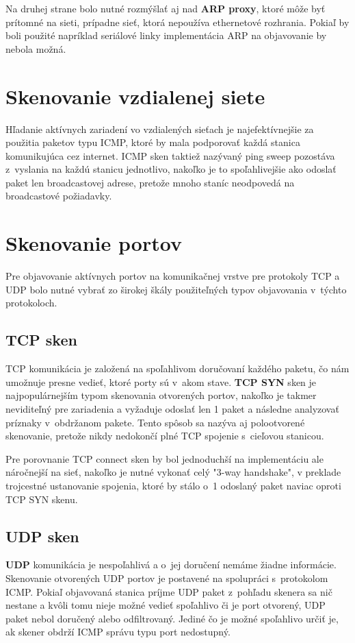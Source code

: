 Na druhej strane bolo nutné rozmýšlať aj nad \textbf{ARP proxy}, ktoré môže byť prítomné na sieti, prípadne sieť, ktorá nepoužíva ethernetové rozhrania. Pokiaľ by boli použité napríklad seriálové linky implementácia ARP na objavovanie by nebola možná.

\section{Skenovanie vzdialenej siete}
Hľadanie aktívnych zariadení vo vzdialených sieťach je najefektívnejšie za použitia paketov typu ICMP, ktoré by mala podporovať každá stanica komunikujúca cez internet. ICMP sken taktiež nazývaný ping sweep pozostáva z~vyslania na každú stanicu jednotlivo, nakoľko je to spoľahlivejšie ako odoslať paket len broadcastovej adrese, pretože mnoho staníc neodpovedá na broadcastové požiadavky.

\section{Skenovanie portov} 
Pre objavovanie aktívnych portov na komunikačnej vrstve pre protokoly TCP a UDP bolo nutné vybrať zo širokej škály použiteľných typov objavovania v~týchto protokoloch.

\subsection{TCP sken}
TCP komunikácia je založená na spoľahlivom doručovaní každého paketu, čo nám umožnuje presne vedieť, ktoré porty sú v~akom stave. \textbf{TCP SYN} sken je najpopulárnejším typom skenovania otvorených portov, nakoľko je takmer neviditeľný pre zariadenia a vyžaduje odoslať len 1 paket a následne analyzovať príznaky v~obdržanom pakete. Tento spôsob sa nazýva aj polootvorené skenovanie, pretože nikdy nedokončí plné TCP spojenie s~cieľovou stanicou. 

Pre porovnanie TCP connect sken by bol jednoduchší na implementáciu ale náročnejší na sieť, nakoľko je nutné vykonať celý "3-way handshake", v preklade trojcestné ustanovanie spojenia, ktoré by stálo o~1 odoslaný paket naviac oproti TCP SYN skenu. 

\subsection{UDP sken}
\textbf{UDP} komunikácia je nespoľahlivá a o~jej doručení nemáme žiadne informácie. Skenovanie otvorených UDP portov je postavené na spolupráci s~protokolom ICMP. Pokiaľ objavovaná stanica príjme UDP paket z~pohľadu skenera sa nič nestane a kvôli tomu nieje možné vedieť spoľahlivo či je port otvorený, UDP paket nebol doručený alebo odfiltrovaný. Jediné čo je možné spoľahlivo určiť je, ak skener obdrží ICMP správu typu port nedostupný.

